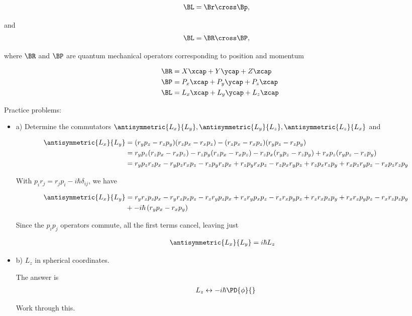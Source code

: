 \begin{align}\label{eqn:PHY356Foct19:1000}
\BL &= \Br \cross \Bp,
\end{align}

and
\begin{align}\label{eqn:PHY356Foct19:1001}
\BL &= \BR \cross \BP,
\end{align}

where $\BR$ and $\BP$ are quantum mechanical operators corresponding to position and momentum

\begin{align}\label{eqn:PHY356Foct19:1002}
\BR &= X \xcap + Y \ycap + Z \zcap \\
\BP &= P_x \xcap + P_y \ycap + P_z \zcap \\
\BL &= L_x \xcap + L_y \ycap + L_z \zcap
\end{align}

Practice problems:
\begin{itemize}
\item a) Determine the commutators $\antisymmetric{L_x}{L_y}, \antisymmetric{L_y}{L_z}, \antisymmetric{L_z}{L_x}$ and

\begin{align*}
\antisymmetric{L_x}{L_y}
&=
(r_y p_z -r_z p_y)
(r_z p_x -r_x p_z)
-
(r_z p_x -r_x p_z)
(r_y p_z -r_z p_y) \\
&=
r_y p_z (r_z p_x -r_x p_z)
-r_z p_y (r_z p_x -r_x p_z)
- r_z p_x (r_y p_z -r_z p_y)
+ r_x p_z (r_y p_z -r_z p_y) \\
&=
r_y p_z r_z p_x
-r_y p_z r_x p_z
-r_z p_y r_z p_x
+r_z p_y r_x p_z
- r_z p_x r_y p_z
+ r_z p_x r_z p_y
+ r_x p_z r_y p_z
- r_x p_z r_z p_y \\
\end{align*}

With $p_i r_j = r_j p_i - i \hbar \delta_{ij}$, we have

\begin{align*}
\antisymmetric{L_x}{L_y}
&=
r_y r_z p_z p_x
-r_y r_z p_x p_z
-r_z r_y p_z p_x
+r_z r_y p_x p_z
- r_z r_x p_y p_z
+ r_z r_x p_z p_y
+ r_x r_z p_y p_z
- r_x r_z p_z p_y \\
&+
-i \hbar 
\left(
r_y p_x
- r_x p_y 
\right)
\end{align*}

Since the $p_i p_j$ operators commute, all the first terms cancel, leaving just

\begin{align*}
\antisymmetric{L_x}{L_y}
&=i \hbar L_z
\end{align*}


\item b) $L_z$ in spherical coordinates.

The answer is
\begin{align}\label{eqn:PHY356Foct19:1003}
L_z \leftrightarrow -i \hbar \PD{\phi}{}
\end{align}

Work through this.
\end{itemize}

